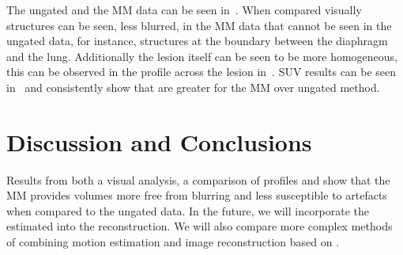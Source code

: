      The ungated and the \gls{MM} data can be seen in~. When compared visually structures can be seen, less blurred, in the \gls{MM} data that cannot be seen in the ungated data, for instance, structures at the boundary between the diaphragm and the lung. Additionally the lesion itself can be seen to be more homogeneous, this can be observed in the profile across the lesion in~. \gls{SUV} results can be seen in~ and consistently show that  are greater for the \gls{MM} over ungated method.

\vspace{-0.5cm}

\section{Discussion and Conclusions} \label{sec:discussion_and_conclusions}
    Results from both a visual analysis, a comparison of profiles and  show that the \gls{MM} provides volumes more free from blurring and less susceptible to artefacts when compared to the ungated data.
    In the future, we will incorporate the estimated  into the reconstruction. We will also compare  more complex methods of combining  motion estimation and image reconstruction based on \cite{Bousse2016b}.
    